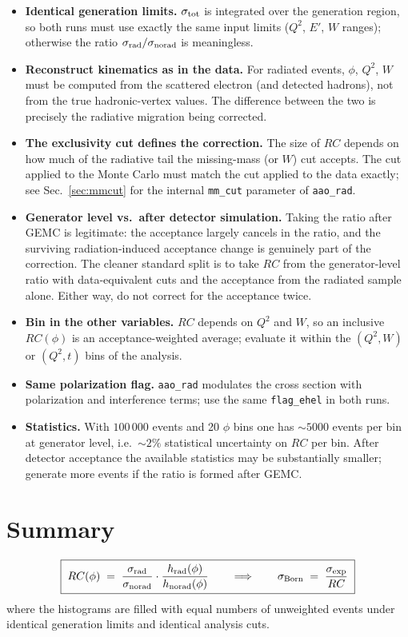 \documentclass[11pt]{article}
\begin{document}
\begin{itemize}
  \item \textbf{Identical generation limits.}
        $\sigma_{\rm tot}$ is integrated over the generation region, so both
        runs must use exactly the same input limits ($Q^2$, $E'$, $W$
        ranges); otherwise the ratio $\sigma_{\rm rad}/\sigma_{\rm norad}$ is
        meaningless.
  \item \textbf{Reconstruct kinematics as in the data.}
        For radiated events, $\phi$, $Q^2$, $W$ must be computed from the
        scattered electron (and detected hadrons), not from the true
        hadronic-vertex values. The difference between the two is precisely
        the radiative migration being corrected.
  \item \textbf{The exclusivity cut defines the correction.}
        The size of $RC$ depends on how much of the radiative tail the
        missing-mass (or $W$) cut accepts. The cut applied to the Monte
        Carlo must match the cut applied to the data exactly; see
        Sec.~\ref{sec:mmcut} for the internal \texttt{mm\_cut} parameter of
        \texttt{aao\_rad}.
  \item \textbf{Generator level vs.\ after detector simulation.}
        Taking the ratio after GEMC is legitimate: the acceptance largely
        cancels in the ratio, and the surviving radiation-induced acceptance
        change is genuinely part of the correction. The cleaner standard
        split is to take $RC$ from the generator-level ratio with
        data-equivalent cuts and the acceptance from the radiated sample
        alone. Either way, do not correct for the acceptance twice.
  \item \textbf{Bin in the other variables.}
        $RC$ depends on $Q^2$ and $W$, so an inclusive $RC(\phi)$ is an
        acceptance-weighted average; evaluate it within the $(Q^2,W)$ or
        $(Q^2,t)$ bins of the analysis.
  \item \textbf{Same polarization flag.}
        \texttt{aao\_rad} modulates the cross section with polarization and
        interference terms; use the same \texttt{flag\_ehel} in both runs.
  \item \textbf{Statistics.}
        With $100\,000$ events and 20 $\phi$ bins one has $\sim 5000$
        events per bin at generator level, i.e.\ $\sim 2\%$ statistical
        uncertainty on $RC$ per bin. After detector acceptance the available
        statistics may be substantially smaller; generate more events if the
        ratio is formed after GEMC.
\end{itemize}

\section{Summary}

\begin{equation}
  \boxed{\;
  RC(\phi) \;=\;
  \frac{\sigma_{\rm rad}}{\sigma_{\rm norad}}\cdot
  \frac{h_{\rm rad}(\phi)}{h_{\rm norad}(\phi)}
  \qquad\Longrightarrow\qquad
  \sigma_{\rm Born} \;=\; \frac{\sigma_{\rm exp}}{RC}
  \;}
\end{equation}
where the histograms are filled with equal numbers of unweighted events
under identical generation limits and identical analysis cuts.
\end{document}
